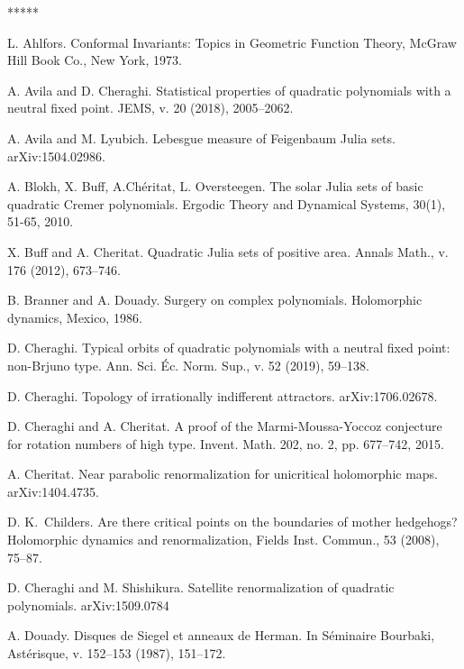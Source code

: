 \documentclass{amsart}
\newcommand{\1}{{\mathbb 1 }}
\theoremstyle{remark}
\numberwithin{equation}{section}
\theoremstyle{definition}
\begin{document}
 
\begin{thebibliography}{*****}

 L. Ahlfors. Conformal Invariants: Topics in Geometric Function Theory, McGraw Hill Book Co., New York, 1973.






 A. Avila and D. Cheraghi.
  Statistical properties of quadratic polynomials with a neutral fixed point.
  JEMS, v. 20 (2018), 2005--2062.

 


 A. Avila and M. Lyubich. 
Lebesgue measure of Feigenbaum Julia sets. arXiv:1504.02986. 



 A. Blokh, X. Buff, A.Chéritat, L. Oversteegen. The solar Julia sets of basic quadratic Cremer polynomials. Ergodic Theory and Dynamical Systems, 30(1), 51-65, 2010.


 X. Buff and A. Cheritat. Quadratic Julia sets of
  positive area. Annals Math., v. 176 (2012), 673--746.

 B. Branner and A. Douady. Surgery on complex polynomials. Holomorphic dynamics, {M}exico, 1986.

  D. Cheraghi. Typical orbits of quadratic polynomials with a neutral fixed point: non-Brjuno type. Ann. Sci. \'Ec. Norm. Sup., v. 52 (2019), 59--138.

  D. Cheraghi.  Topology of irrationally indifferent attractors. arXiv:1706.02678.
   
   D. Cheraghi and A. Cheritat. A proof of the Marmi-Moussa-Yoccoz conjecture for rotation numbers of high type. Invent. Math. 202, no. 2, pp. 677–742, 2015.

  A. Cheritat. Near parabolic renormalization for unicritical holomorphic maps. arXiv:1404.4735.


   
  D. K.~Childers. Are there critical points on the boundaries of mother hedgehogs? Holomorphic dynamics and renormalization, Fields Inst. Commun., 53 (2008), 75–87.  


 D. Cheraghi and M. Shishikura. Satellite renormalization of quadratic polynomials. arXiv:1509.0784


 A. Douady. Disques de Siegel et anneaux de Herman. In S\'eminaire Bourbaki,
  Ast\'erisque, v. 152--153 (1987), 151--172. 




\end{thebibliography}
\end{document}
